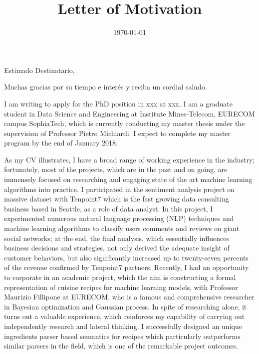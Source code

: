 \documentclass[10pt,a4paper,roman]{moderncv}        %
\title{Letter of Motivation}                               %
\begin{document}
\date{\today}
\opening{Estimado Destinatario,}
\closing{Muchas gracias por su tiempo e interés y reciba un cordial saludo.}
\makelettertitle

I am writing to apply for the PhD position in {xxx} at {xxx}. I am a graduate student in Data Science and Engineering at Institute Mines-Telecom, EURECOM campus SophiaTech, which is currently conducting my master thesis under the supervision of Professor Pietro Michiardi. I expect to complete my master program by the end of January 2018. 

As my CV illustrates, I have a broad range of working experience in the industry; fortunately, most of the projects, which are in the past and on going, are immensely focused on researching and engaging state of the art machine learning algorithms into practice. I participated in the sentiment analysis project on massive dataset with Tenpoint7 which is the fast growing data consulting business based in Seattle, as a role of data analyst. In this project, I experimented numerous natural language processing (NLP) techniques and machine learning algorithms to classify users comments and reviews on giant social networks; at the end, the final analysis, which essentially influences business decisions and strategies, not only derived the adequate insight of customer behaviors, but also significantly increased up to twenty-seven percents of the revenue confirmed by Tenpoint7 partners. Recently, I had an opportunity to corporate in an academic project, which the aim is constructing a formal representation of cuisine recipes for machine learning models, with Professor Maurizio Fillipone at EURECOM, who is a famous and comprehensive researcher in Bayesian optimization and Gaussian process. In spite of researching alone, it turns out a valuable experience, which reinforces my capability of carrying out independently research and lateral thinking. I successfully designed an unique ingredients parser based semantics for recipes which particularly outperforms similar parsers in the field, which is one of the remarkable project outcomes.
\end{document}
